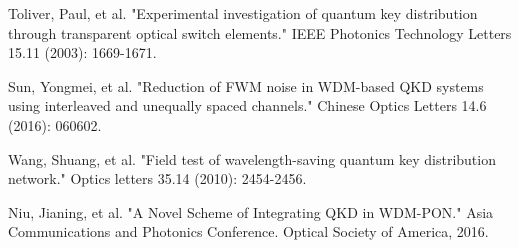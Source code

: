 \documentclass[letterpaper,10pt]{article}
\begin{document}
\begin{thebibliography}{99}

 Toliver, Paul, et al. "Experimental investigation of quantum key distribution through transparent optical switch elements." IEEE Photonics Technology Letters 15.11 (2003): 1669-1671.

 Sun, Yongmei, et al. "Reduction of FWM noise in WDM-based QKD systems using interleaved and unequally spaced channels." Chinese Optics Letters 14.6 (2016): 060602.

 Wang, Shuang, et al. "Field test of wavelength-saving quantum key distribution network." Optics letters 35.14 (2010): 2454-2456.


 Niu, Jianing, et al. "A Novel Scheme of Integrating QKD in WDM-PON." Asia Communications and Photonics Conference. Optical Society of America, 2016.

\end{thebibliography}
\end{document}
